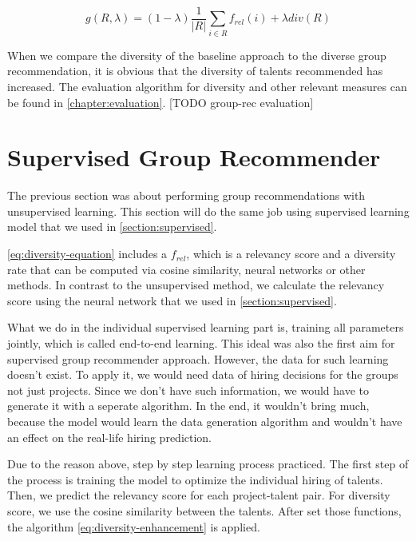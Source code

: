 \begin{equation}
g ( R , \lambda ) = ( 1 - \lambda ) \frac { 1 } { | R | } \sum _ { i \in R } f _ { r e l } ( i ) + \lambda d i v ( R )
\label{eq:diversity-equation}
\end{equation}

When we compare the diversity of the baseline approach to the diverse group recommendation, it is obvious that the diversity of talents recommended has increased. The evaluation algorithm for diversity and other relevant measures can be found in \autoref{chapter:evaluation}. [TODO group-rec evaluation]

\section{Supervised Group Recommender}\label{section:supervised-group-rec}

The previous section was about performing group recommendations with unsupervised learning. This section will do the same job using supervised learning model that we used in \autoref{section:supervised}.

\autoref{eq:diversity-equation} includes a $f _ { r e l } $, which is a relevancy score and a diversity rate that can be computed via cosine similarity, neural networks or other methods. In contrast to the unsupervised method, we calculate the relevancy score using the neural network that we used in \autoref{section:supervised}.

What we do in the individual supervised learning part is, training all parameters jointly, which is called end-to-end learning. This ideal was also the first aim for supervised group recommender approach. However, the data for such learning doesn't exist. To apply it, we would need data of hiring decisions for the groups not just projects. Since we don't have such information, we would have to generate it with a seperate algorithm. In the end, it wouldn't bring much, because the model would learn the data generation algorithm and wouldn't have an effect on the real-life hiring prediction.

Due to the reason above, step by step  learning process practiced. The first step of the process is training the model to optimize the individual hiring of talents. Then, we predict the relevancy score for each project-talent pair. For diversity score, we use the cosine similarity between the talents. After set those functions, the algorithm \ref{eq:diversity-enhancement} is applied.

